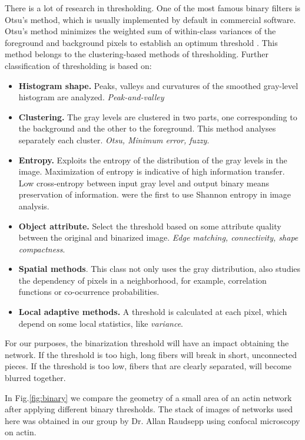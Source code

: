 There is a lot of research in thresholding. One of the most famous binary
filters is Otsu's method, which is usually implemented by default in commercial software.
Otsu's method minimizes the weighted sum of within-class variances of the
foreground and background pixels to establish an optimum threshold
\citep{sezgin_survey_2004}. This method belongs to the clustering-based methods
of thresholding. Further classification of thresholding is based on:
\begin{itemize}
  \item \textbf{Histogram shape.} Peaks, valleys and curvatures of the smoothed
  gray-level histogram are analyzed. \emph{Peak-and-valley}
  \item \textbf{Clustering.} The gray levels are clustered in two parts, one
  corresponding to the background and the other to the foreground. This method
  analyses separately each cluster. \emph{Otsu, Minimum error, fuzzy}.
  \item \textbf{Entropy.} Exploits the entropy of the distribution of the gray
  levels in the image. Maximization of entropy is indicative of high information transfer.
  Low cross-entropy between input gray level and output binary means
  preservation of information. \citet{pal_automatic_1983}
  were the first to use Shannon entropy in image analysis.
 \citep{pal_image_1988}
  \item \textbf{Object attribute.} Select the threshold based on some attribute
  quality between the original and binarized image. \emph{Edge matching, connectivity,
  shape compactness}.
  \item \textbf{Spatial methods}. This class not only uses the gray
  distribution, also studies the dependency of pixels in a neighborhood, for example, correlation
functions or co-ocurrence probabilities.
  \item \textbf{Local adaptive methods.} A threshold is calculated at each
  pixel, which depend on some local statistics, like \emph{variance}.
\end{itemize}



For our purposes, the binarization threshold will have an impact obtaining the
network. If the threshold is too high, long fibers will break in short,
unconnected pieces. If the threshold is too low, fibers that are clearly
separated, will become blurred together.

In Fig.\ref{fig:binary}
we compare the geometry of a small area of an actin network after
applying different binary thresholds. The stack of images of
networks used here was obtained in our group by Dr. Allan
Raudsepp using confocal microscopy on actin.
 


